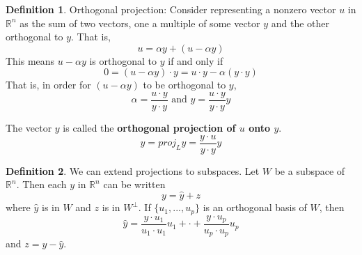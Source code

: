 \documentclass[letterpaper]{article}
\theoremstyle{definition}
\newtheorem{definition}{Definition}[section]
\begin{document}
\begin{definition}{Orthogonal projection: }
Consider representing a nonzero vector $u$ in $\mathbb{R}^n$ as the sum of two vectors, one a multiple of some vector $y$ and the other orthogonal to $y$. That is, 
$$u = \alpha y + (u - \alpha y)$$
This means $u - \alpha y$ is orthogonal to $y$ if and only if 
$$ 0 = (u - \alpha y) \cdot y = u \cdot y - \alpha (y \cdot y)$$
That is, in order for $(u - \alpha y)$ to be orthogonal to $y$, 
$$\alpha = \frac{u \cdot y}{y \cdot y} \text{ and } y = \frac{u \cdot y}{y \cdot y} y$$

The vector $y$ is called the \textbf{orthogonal projection of $u$ onto $y$}. 
$$ y = proj_{L} y = \frac{y \cdot u}{y \cdot y} y$$
\end{definition}

\begin{definition}
We can extend projections to subspaces. Let $W$ be a subspace of $\mathbb{R}^n$. Then each $y$ in $\mathbb{R}^n$ can be written 
$$y = \hat{y} + z $$
where $\hat{y}$ is in $W$ and $z$ is in $W^{\perp}$. If $\{ u_1 , ..., u_p \}$ is an orthogonal basis of $W$, then 
$$\hat{y} = \frac{y \cdot u_1}{u_1 \cdot u_1} u_1 + \cdot + \frac{y \cdot u_p}{u_p \cdot u_p} u_p$$
and $z = y - \hat{y}$. 
\end{definition}
\end{document}
